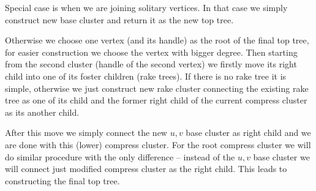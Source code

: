 Special case is when we are joining solitary vertices. In that case we simply
construct new base cluster and return it as the new top tree.

Otherwise we choose one vertex (and its handle) as the root of the final top tree,
for easier construction we choose the vertex with bigger degree. Then starting
from the second cluster (handle of the second vertex) we firstly move its right
child into one of its foster children (rake trees). If there is no rake tree it
is simple, otherwise we just construct new rake cluster connecting the existing
rake tree as one of its child and the former right child of the current compress
cluster as its another child.


After this move we simply connect the new $u,v$ base cluster as right child and we
are done with this (lower) compress cluster. For the root compress cluster we
will do similar procedure with the only difference -- instead of the $u,v$ base
cluster we will connect just modified compress cluster as the right child. This
leads to constructing the final top tree.
